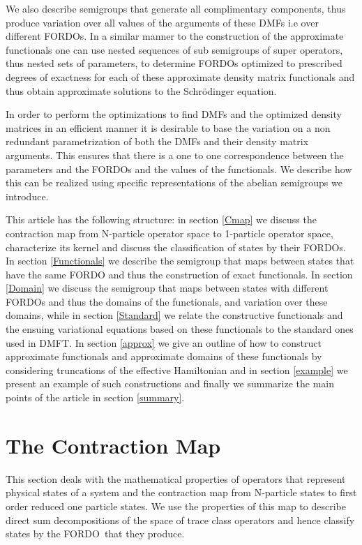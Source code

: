 \documentclass[aps,preprint]{revtex4}%
\begin{document}
We also describe semigroups that generate all complimentary components, thus
produce variation over all values of the arguments of these DMFs i.e over
different FORDOs. In a similar manner to the construction of the approximate
functionals one can use nested sequences of sub semigroups of super operators,
thus nested sets of parameters, to determine FORDOs optimized to prescribed
degrees of exactness for each of these approximate density matrix functionals
and thus obtain approximate solutions to the Schr\"{o}dinger equation.

In order to perform the optimizations to find DMFs and the optimized density
matrices in an efficient manner it is desirable to base the variation on a non
redundant parametrization of both the DMFs and their density matrix arguments.
This ensures that there is a one to one correspondence between the parameters
and the FORDOs and the values of the functionals. We describe how this can be
realized using specific representations of the abelian semigroups we introduce.

This article has the following structure: in section \ref{Cmap} we discuss the
contraction map from N-particle operator space to 1-particle operator space,
characterize its kernel and discuss the classification of states by their
FORDOs. In section \ref{Functionals} we describe the semigroup that maps
between states that have the same FORDO and thus the construction of exact
functionals. In section \ref{Domain} we discuss the semigroup that maps
between states with different FORDOs and thus the domains of the functionals,
and variation over these domains, while in section \ref{Standard} we relate
the constructive functionals and the ensuing variational equations based on
these functionals to the standard ones used in DMFT. In section \ref{approx}
we give an outline of how to construct approximate functionals and approximate
domains of these functionals by considering truncations of the effective
Hamiltonian and in section \ref{example} we present an example of such
constructions and finally we summarize the main points of the article in
section \ref{summary}.

\section{The Contraction Map\label{Cmap}}

This section deals with the mathematical properties of operators that
represent physical states of a system and the contraction map from N-particle
states to first order reduced one particle states. We use the properties of
this map to describe direct sum decompositions of the space of trace class
operators and hence classify states by the FORDO\ that they produce.
\end{document}
